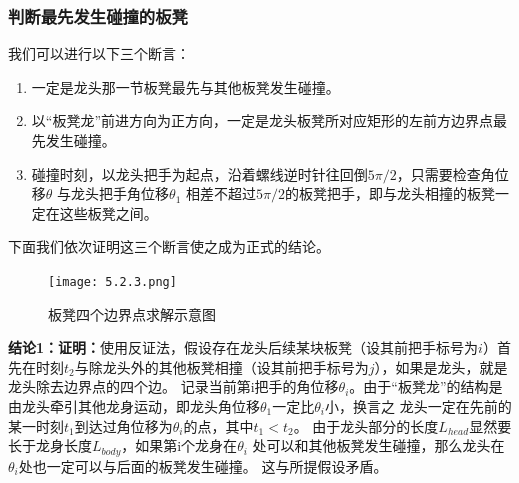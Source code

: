 \documentclass{cumcmthesis1}
\begin{document}
\subsubsection{判断最先发生碰撞的板凳}
\par
我们可以进行以下三个断言：
\begin{enumerate}
    \item 一定是龙头那一节板凳最先与其他板凳发生碰撞。
    \item 以“板凳龙”前进方向为正方向，一定是龙头板凳所对应矩形的左前方边界点最先发生碰撞。
    \item 碰撞时刻，以龙头把手为起点，沿着螺线逆时针往回倒$ 5 \pi/2$，只需要检查角位移$\theta$
    与龙头把手角位移$\theta_1$ 相差不超过$ 5 \pi/2$的板凳把手，即与龙头相撞的板凳一定在这些板凳之间。
\end{enumerate}
\par
下面我们依次证明这三个断言使之成为正式的结论。
\begin{figure}
    \caption{板凳四个边界点求解示意图}
    \centering    
    \texttt{[image: 5.2.3.png]}
\end{figure}
\par
\textbf{结论1：证明：}使用反证法，假设存在龙头后续某块板凳（设其前把手标号为$i$）首先在时刻$t_2$与除龙头外的其他板凳相撞（设其前把手标号为$j$），如果是龙头，就是龙头除去边界点的四个边。
记录当前第i把手的角位移$\theta_i$。由于“板凳龙”的结构是由龙头牵引其他龙身运动，即龙头角位移$\theta_1$一定比$\theta_i$小，换言之
龙头一定在先前的某一时刻$t_1$到达过角位移为$\theta_i$的点，其中$t_1<t_2$。
由于龙头部分的长度$L_{head}$显然要长于龙身长度$L_{body}$，如果第i个龙身在$\theta_i$
处可以和其他板凳发生碰撞，那么龙头在$\theta_i$处也一定可以与后面的板凳发生碰撞。
这与所提假设矛盾。
\end{document}
